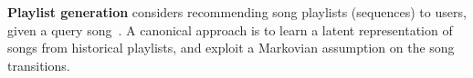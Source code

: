 
%


%


%
{\bf Playlist generation}
considers recommending song playlists (\ie sequences) to users, given a query song~\citep{McFee:2011,chen2012playlist,hidasi2015session,choi2016towards}.
A canonical approach is to
learn a latent representation of songs from historical playlists,
and exploit a Markovian assumption on the song transitions.


